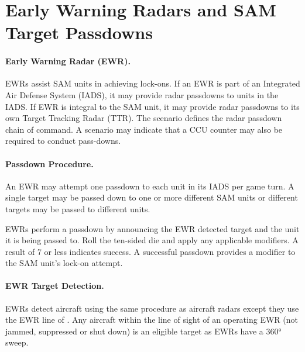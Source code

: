 \section{Early Warning Radars and SAM Target Passdowns}



    \paragraph{Early Warning Radar (EWR).} EWRs assist SAM units in achieving lock-ons. If an EWR is part of an Integrated Air Defense System (IADS), it may provide radar passdowns to units in the IADS. If EWR is integral to the SAM unit, it may provide radar passdowns to its own Target Tracking Radar (TTR). The scenario defines the radar passdown chain of command. A scenario may indicate that a CCU counter may also be required to conduct pass-downs.

\paragraph{Passdown Procedure.} An EWR may attempt one passdown to each unit in its IADS per game turn. A single target may be passed down to one or more different SAM units or different targets may be passed to different units.

EWRs perform a passdown by announcing the EWR detected target and the unit it is being passed to. Roll the ten-sided die and apply any applicable modifiers. A result of 7 or less indicates success. A successful passdown provides a  modifier to the SAM unit's lock-on attempt.

\paragraph{EWR Target Detection.}  EWRs detect aircraft using the same procedure as aircraft radars except they use the EWR line of . Any aircraft within the line of sight of an operating EWR (not jammed, suppressed or shut down) is an eligible target as EWRs have a 360° sweep.  



